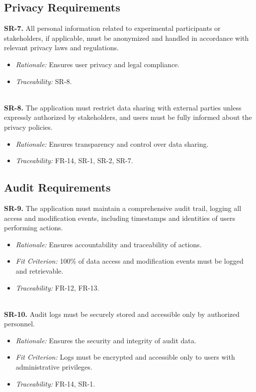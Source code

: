 \documentclass[12pt]{article}
\begin{document}
\subsection{Privacy Requirements}
\textbf{SR-7.} All personal information related to experimental
  participants or stakeholders, if applicable, must be anonymized and handled in
  accordance with relevant privacy laws and regulations.
  \begin{itemize}
    \item \textit{Rationale:} Ensures user privacy and legal compliance.
    \item \textit{Traceability:} SR-8.
  \end{itemize}
\ \\
\textbf{SR-8.} The application must restrict data sharing with external
  parties unless expressly authorized by stakeholders, and users must be fully
  informed about the privacy policies.
  \begin{itemize}
    \item \textit{Rationale:} Ensures transparency and control over data
    sharing.
    \item \textit{Traceability:} FR-14, SR-1, SR-2, SR-7.
  \end{itemize}

\subsection{Audit Requirements}
\textbf{SR-9.} The application must maintain a comprehensive audit
  trail, logging all access and modification events, including timestamps and
  identities of users performing actions.
  \begin{itemize}
    \item \textit{Rationale:} Ensures accountability and traceability of
    actions.
    \item \textit{Fit Criterion:} 100\% of data access and modification events
    must be logged and retrievable.
    \item \textit{Traceability:} FR-12, FR-13.
  \end{itemize}
\ \\
\textbf{SR-10.} Audit logs must be securely stored and accessible only
  by authorized personnel.
  \begin{itemize}
    \item \textit{Rationale:} Ensures the security and integrity of audit data.
    \item \textit{Fit Criterion:} Logs must be encrypted and accessible only to
    users with administrative privileges.
    \item \textit{Traceability:} FR-14, SR-1.
  \end{itemize}
\end{document}
